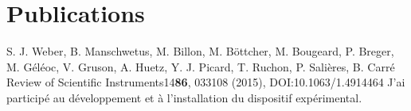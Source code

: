 \part*{Publications}



{S. J. Weber, B. Manschwetus, M. Billon, M. Böttcher, M. Bougeard, P. Breger, M. Géléoc, V. Gruson, A. Huetz, Y. J. Picard, T. Ruchon, P. Salières, B. Carré} 
{Review of Scientific Instruments}{14}{\textbf{86}, 033108 (2015), DOI:10.1063/1.4914464}
{J'ai participé au développement et à l'installation du dispositif expérimental.}
\par\noindent

